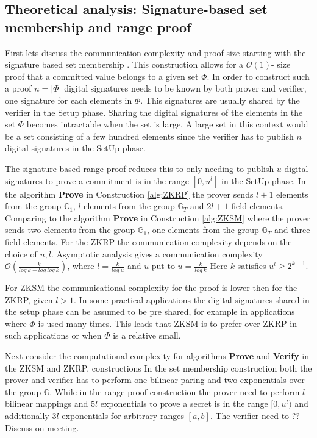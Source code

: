 \subsection{Theoretical analysis: Signature-based set membership and range proof}

First lets discuss the communication complexity and proof size starting with the signature based set membership . This construction allows for a $\mathcal{O}(1)$- size proof that a committed value belongs to a given set $\Phi$. In order to construct such a proof $n=|\Phi|$ digital signatures needs to be known by both prover and verifier, one signature for each elements in $\Phi$. This signatures are usually shared by the verifier in the Setup phase. Sharing the digital signatures of the elements in the set $\Phi$ becomes intractable when the set is large.  A large set in this context would be a set consisting of a few hundred elements since the verifier has to publish $n$ digital signatures in the SetUp phase. 

The signature based range proof reduces this to only needing to publish $u$ digital signatures to prove a commitment is in the range $[0,u^l]$ in the SetUp phase. In the algorithm \textbf{Prove} in Construction \ref{alg:ZKRP} the prover sends $l+1$ elements from the group $\mathds{G}_1$, $l$ elements from the group $\mathds{G}_T$ and $2l+1$ field elements. Comparing to the algorithm \textbf{Prove} in Construction \ref{alg:ZKSM} where the prover sends two elements from the group $\mathds{G}_1$, one elements from the group $\mathds{G}_T$ and three field elements. For the ZKRP the communication complexity depends on the choice of $u,l$. Asymptotic analysis gives a communication complexity $\mathcal{O}(\frac{k}{log\:k-log\:log\:k})$, where $l=\frac{k}{log\:u}$ and $u$ put to $u=\frac{k}{log\: k}$ Here $k$ satisfies $u^l \geq 2^{k-1}$.

For ZKSM the communicational complexity for the proof is lower then for the ZKRP, given $l>1$. In some practical applications the digital signatures shared in the setup phase can be assumed to be pre shared, for example in applications where $\Phi$ is used many times. This leads that ZKSM is to prefer over ZKRP in such applications or when $\Phi$ is a relative small. 

Next consider the computational complexity for algorithms \textbf{Prove} and \textbf{Verify} in the ZKSM and ZKRP. constructions  In the set membership construction both the prover and verifier has to perform one bilinear paring and two exponentials over the group $\mathds{G}$. While in the range proof construction the prover need to perform $l$ bilinear mappings and $5l$ exponentials to prove a secret is in the range $[0,u^l)$ and additionally $3l$ exponentials for arbitrary ranges $[a,b]$. The verifier need to ?? Discuss on meeting.
 

